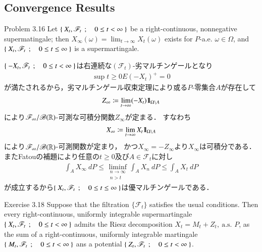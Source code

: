 \subsection{Convergence Results}
	\begin{itembox}[l]{Problem 3.16}
		Let $\left\{\ X_t,\mathscr{F}_t\ \, ; \quad 0 \leq t < \infty\ \right\}$ be a right-continuous, nonnegative
		supermatingale; then $X_\infty(\omega) = \lim_{t \to \infty} X_t(\omega)$ exists for
		$P$-a.e. $\omega \in \Omega$, and $\left\{\ X_t,\mathscr{F}_t\ \, ; \quad 0 \leq t \leq \infty\ \right\}$ is a supermartingale.
	\end{itembox}
	
	\begin{prf}
		$\left\{\ -X_t,\mathscr{F}_t\ \, ; \quad 0 \leq t < \infty\ \right\}$は右連続な$(\mathscr{F}_t)$-劣マルチンゲールとなり
		\begin{align}
			\sup{t \geq 0}{E(-X_t)^+} = 0
		\end{align}
		が満たされるから，劣マルチンゲール収束定理により或る$P$-零集合$A$が存在して
		\begin{align}
			Z_\infty \coloneqq \lim_{t \to \infty} (-X_t)\mbox{1}\hspace{-0.25em}\mbox{l}_{\Omega \backslash A}
		\end{align}
		により$\mathscr{F}_\infty/\mathscr{B}(\mathbb{R})$-可測な可積分関数$Z_\infty$が定まる．
		すなわち
		\begin{align}
			X_\infty \coloneqq \lim_{t \to \infty} X_t\mbox{1}\hspace{-0.25em}\mbox{l}_{\Omega \backslash A}
		\end{align}
		により$\mathscr{F}_\infty/\mathscr{B}(\mathbb{R})$-可測関数が定まり，
		かつ$X_\infty = -Z_\infty$より$X_\infty$は可積分である．
		またFatouの補題により任意の$t \geq 0$及び$A \in \mathscr{F}_t$に対し
		\begin{align}
			\int_A X_\infty\ dP \leq \liminf_{\substack{n \to \infty \\ n > t}} \int_A X_n\ dP \leq \int_A X_t\ dP
		\end{align}
		が成立するから$\left\{\ X_t,\mathscr{F}_t\ \, ; \quad 0 \leq t \leq \infty\ \right\}$は優マルチンゲールである．
		\QED
	\end{prf}
	
	\begin{itembox}[l]{Exercise 3.18}
		Suppose that the filtration $\{\mathscr{F}_t\}$ satisfies the usual conditions.
		Then every right-continuous, uniformly integrable supermartingale $\left\{\ X_t,\mathscr{F}_t\ \, ; \quad 0 \leq t < \infty\ \right\}$
		admits the Riesz decomposition $X_t = M_t + Z_t,\ \mbox{a.s. $P$}$, as the sum
		of a right-continuous, uniformly integrable martingale $\left\{\ M_t,\mathscr{F}_t\ \, ; \quad 0 \leq t < \infty\ \right\}$
		ans a potential $\left\{\ Z_t,\mathscr{F}_t\ \, ; \quad 0 \leq t < \infty\ \right\}$.
 	\end{itembox}
 	
